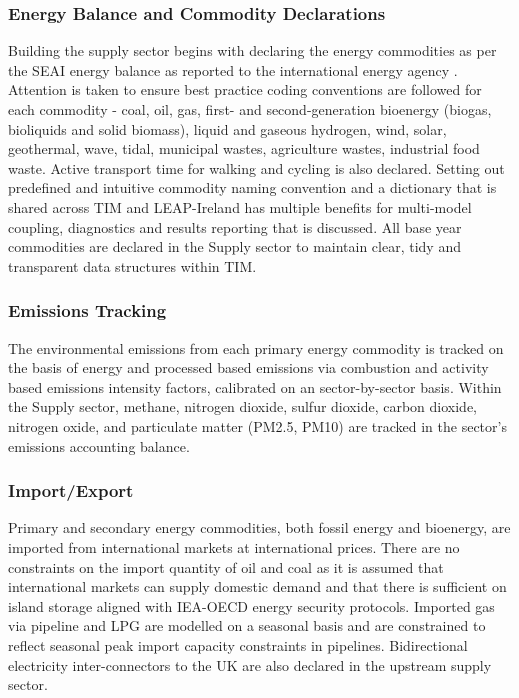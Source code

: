 \documentclass[journal abbreviation, manuscript]{copernicus}
\begin{document}
\subsubsection{Energy Balance and Commodity Declarations}
Building the supply sector begins with declaring the energy commodities as per the SEAI energy balance as reported to the international energy agency \cite{SEAI2019}. Attention is taken to ensure best practice coding conventions are followed for each commodity - coal, oil, gas, first- and second-generation bioenergy (biogas, bioliquids and solid biomass), liquid and gaseous hydrogen, wind, solar, geothermal, wave, tidal, municipal wastes, agriculture wastes, industrial food waste. Active transport time for walking and cycling is also declared. Setting out predefined and intuitive commodity naming convention and a dictionary that is shared across TIM and LEAP-Ireland has multiple benefits for multi-model coupling, diagnostics and results reporting that is discussed. All base year commodities are declared in the Supply sector to maintain clear, tidy and transparent data structures within TIM.

\subsubsection{Emissions Tracking}
The environmental emissions from each primary energy commodity is tracked on the basis of energy and processed based emissions via combustion and activity based emissions intensity factors, calibrated on an sector-by-sector basis. Within the Supply sector, methane, nitrogen dioxide, sulfur dioxide, carbon dioxide, nitrogen oxide, and particulate matter (PM2.5, PM10) are tracked in the sector's emissions accounting balance.

\subsubsection{Import/Export}
Primary and secondary energy commodities, both fossil energy and bioenergy, are imported from international markets at international prices. There are no constraints on the import quantity of oil and coal as it is assumed that international markets can supply domestic demand and that there is sufficient on island storage aligned with IEA-OECD energy security protocols. Imported gas via pipeline and LPG are modelled on a seasonal basis and are constrained to reflect seasonal peak import capacity constraints in pipelines. Bidirectional electricity inter-connectors to the UK are also declared in the upstream supply sector.
\end{document}
